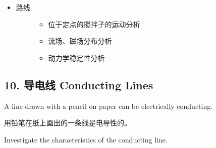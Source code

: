 \documentclass[a4paper,10pt,english]{sphinxmanual}
\begin{document}
\begin{itemize}
\begin{description}
\begin{itemize}
\begin{enumerate}
\begin{enumerate}
\end{enumerate}

\end{enumerate}

\end{itemize}

\end{description}

\item {} \begin{description}
\item[{路线}] \leavevmode\begin{itemize}
\item {} 
位于定点的搅拌子的运动分析

\item {} 
流场、磁场分布分析

\item {} 
动力学稳定性分析

\end{itemize}

\end{description}

\end{itemize}


\subsection{10. 导电线 Conducting Lines}
\label{\detokenize{8. Appendix:conducting-lines}}
A line drawn with a pencil on paper can be electrically conducting.

用铅笔在纸上画出的一条线是电导性的。

Investigate the characteristics of the conducting line.
\end{document}
